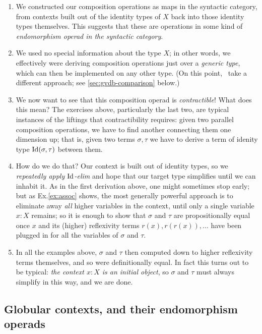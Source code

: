 \begin{enumerate}
\item We constructed our composition operations as maps in the syntactic category, from contexts built out of the identity types of $X$ back into those identity types themselves.  This suggests that these are operations in some kind of \emph{endomorphism operad in the syntactic category}.

\item We used no special information about the type $X$; in other words, we effectively were deriving composition operations just over a \emph{generic type}, which can then be implemented on any other type.  (On this point, \cite{garner-van-den-berg}\ take a different approach; see \PARA\ref{sec:gvdb-comparison} below.)

\item We now want to see that this composition operad is \emph{contractible}!  What does this mean?  The exercises above, particularly the last two, are typical instances of the liftings that contractibility requires: given two parallel composition operations, we have to find another connecting them one dimension up; that is, given two terms $\sigma,\tau$ we have to derive a term of idenity type $\mathrm{Id}(\sigma,\tau)$ between them.

\item How do we do that?  Our context is built out of identity types, so we \emph{repeatedly apply $\mathrm{Id}$-elim} and hope that our target type simplifies until we can inhabit it.  As in the first derivation above, one might sometimes stop early; but as Ex.\ref{ex:assoc} shows, the most generally powerful approach is to eliminate away \emph{all} higher variables in the context, until only a single variable $x:X$ remains; so it is enough to show that $\sigma$ and $\tau$ are propositionally equal once $x$ and its (higher) reflexivity terms $r(x), r(r(x)),\ldots$ have been plugged in for all the variables of $\sigma$ and $\tau$. 

\item In all the examples above, $\sigma$ and $\tau$ then computed down to higher reflexivity terms themselves, and so were definitionally equal.  In fact this turns out to be typical: \emph{the context $x:X$ is an initial object}, so $\sigma$ and $\tau$ must always simplify in this way, and we are done.
\end{enumerate}

\subsection*{Globular contexts, and their endomorphism operads}

